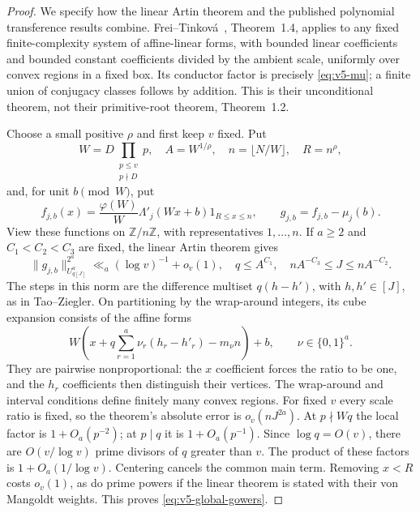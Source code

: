 \begin{proof}
We specify how the linear Artin theorem and the published polynomial
transference results combine. Frei--Tinkov\'a~\cite{v5ft}, Theorem~1.4,
applies to any fixed finite-complexity system of affine-linear forms,
with bounded linear coefficients and bounded constant coefficients divided
by the ambient scale, uniformly over convex regions in a fixed box.
Its conductor factor is precisely \eqref{eq:v5-mu}; a finite union of
conjugacy classes follows by addition. This is their unconditional theorem,
not their primitive-root theorem, Theorem~1.2.

Choose a small positive $\rho$ and first keep $v$ fixed. Put
\[
 W=D\prod_{\substack{p\leq v\\p\nmid D}}p,\quad
 A=W^{1/\rho},\quad n=\lfloor N/W\rfloor,\quad R=n^\rho,
\]
and, for unit $b\pmod W$, put
\[
 f_{j,b}(x)=\frac{\varphi(W)}W\Lambda'_j(Wx+b)1_{R\leq x\leq n},
 \qquad g_{j,b}=f_{j,b}-\mu_j(b).
\]
View these functions on $\mathbb Z/n\mathbb Z$, with representatives
$1,\ldots,n$. If $a\geq2$ and $C_1<C_2<C_3$ are fixed, the linear Artin
theorem gives
\begin{equation}\label{eq:v5-global-gowers}
 \|g_{j,b}\|_{U^a_{q[J]}}^{2^a}
       \ll_a(\log v)^{-1}+o_v(1),
 \quad q\leq A^{C_1},\quad
 nA^{-C_3}\leq J\leq nA^{-C_2}.
\end{equation}
The steps in this norm are the difference multiset $q(h-h')$, with
$h,h'\in[J]$, as in Tao--Ziegler. On partitioning by the wrap-around
integers, its cube expansion consists of the affine forms
\[
 W\left(x+q\sum_{r=1}^a\nu_r(h_r-h'_r)-m_\nu n\right)+b,
 \qquad \nu\in\{0,1\}^a.
\]
They are pairwise nonproportional: the $x$ coefficient forces the ratio to
be one, and the $h_r$ coefficients then distinguish their vertices.
The wrap-around and interval conditions define finitely many convex
regions. For fixed $v$ every scale ratio is fixed, so the theorem's
absolute error is $o_v(nJ^{2a})$.
At $p\nmid Wq$ the local factor is $1+O_a(p^{-2})$; at $p\mid q$ it is
$1+O_a(p^{-1})$. Since $\log q=O(v)$, there are $O(v/\log v)$ prime
divisors of $q$ greater than $v$. The product of these factors is
$1+O_a(1/\log v)$. Centering cancels the common main term. Removing
$x<R$ costs $o_v(1)$, as do prime powers if the linear theorem is stated
with their von Mangoldt weights. This proves \eqref{eq:v5-global-gowers}.


\end{proof}
